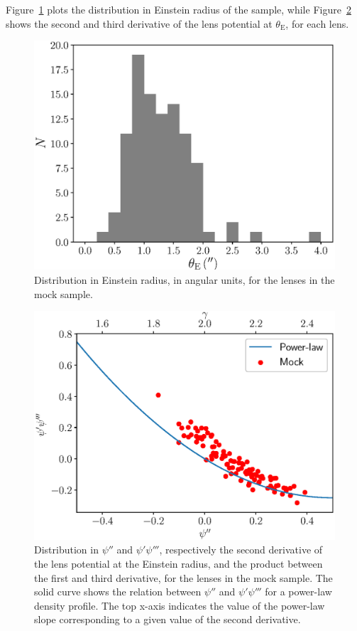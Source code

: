 \documentclass[usenatbib]{mnras}
\def\psii{\psi'}
\def\psiii{\psi''}
\def\psiiii{\psi'''}
\def\tein{\theta_{\mathrm{E}}}
\def\Fref#1{Figure~\ref{#1}\xspace}
\begin{document}
\Fref{fig:rein} plots the distribution in Einstein radius of the sample, while \Fref{fig:psi} shows the second and third derivative of the lens potential at $\tein$, for each lens.
%
\begin{figure}
 \includegraphics[width=\columnwidth]{rein_hist.eps}
 \caption{Distribution in Einstein radius, in angular units, for the lenses in the mock sample.}
 \label{fig:rein}
\end{figure}
%
%
\begin{figure}
 \includegraphics[width=\columnwidth]{psi_plot.eps}
 \caption{Distribution in $\psiii$ and $\psii\psiiii$, respectively the second derivative of the lens potential at the Einstein radius, and the product between the first and third derivative, for the lenses in the mock sample.
The solid curve shows the relation between $\psiii$ and $\psii\psiiii$ for a power-law density profile. The top x-axis indicates the value of the power-law slope corresponding to a given value of the second derivative.
}
 \label{fig:psi}
\end{figure}
\end{document}
